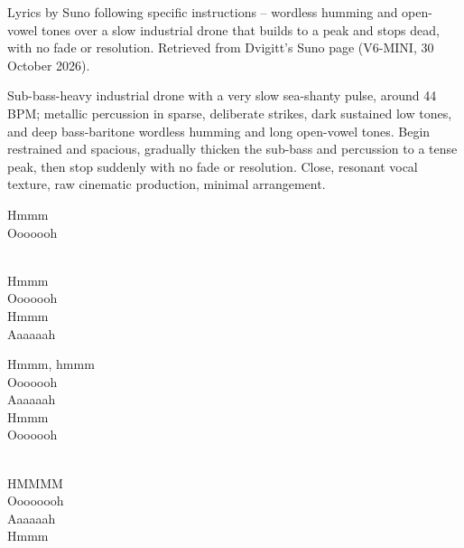 
\label{sec:sudden-stop}
\begin{notes}
Lyrics by Suno following specific instructions -- wordless humming and open-vowel tones over a slow industrial drone that builds to a peak and stops dead, with no fade or resolution. Retrieved from Dvigitt's Suno page (V6-MINI, 30 October 2026).
\end{notes}
\begin{style}
Sub-bass-heavy industrial drone with a very slow sea-shanty pulse, around 44 BPM; metallic percussion in sparse, deliberate strikes, dark sustained low tones, and deep bass-baritone wordless humming and long open-vowel tones. Begin restrained and spacious, gradually thicken the sub-bass and percussion to a tense peak, then stop suddenly with no fade or resolution. Close, resonant vocal texture, raw cinematic production, minimal arrangement.
\end{style}
\begin{lyrics}
Hmmm\\
Ooooooh

\\
Hmmm\\
Ooooooh\\
Hmmm\\
Aaaaaah

Hmmm, hmmm\\
Ooooooh\\
Aaaaaah\\
Hmmm\\
Ooooooh

\\
HMMMM\\
Oooooooh\\
Aaaaaah\\
Hmmm

\end{lyrics}

